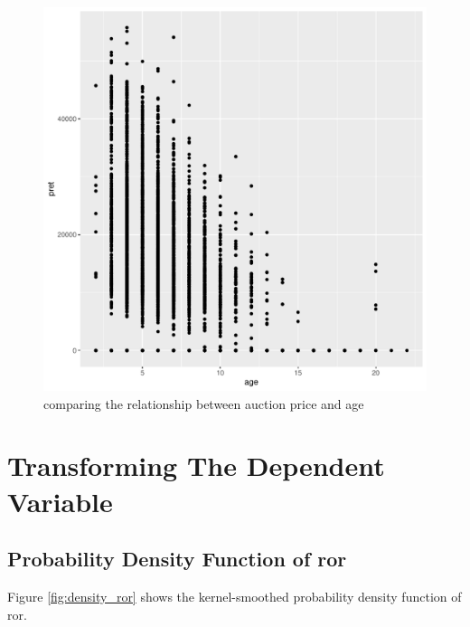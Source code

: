 \documentclass[11pt]{paper}
\begin{document}
\begin{figure}[h!]
  \centering
  \includegraphics[scale = 0.5, keepaspectratio=true]{../Figures/pert_age_plot}
  \caption{comparing the relationship between auction price and age} \label{fig:pret_age_plot}
\end{figure}

\clearpage

\section{Transforming The Dependent Variable}
\subsection{Probability Density Function of ror}

Figure \ref{fig:density_ror} shows  the kernel-smoothed probability density function of  ror.
\end{document}
